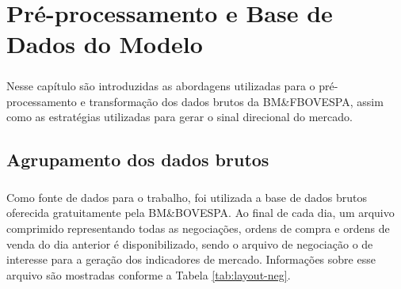 \documentclass[grad,numbers]{coppe}
\begin{document}
\chapter{Pré-processamento e Base de Dados do Modelo}    

    \paragraph{}Nesse capítulo são introduzidas as abordagens utilizadas para o pré-processamento e transformação dos dados brutos da BM\&FBOVESPA, assim como as estratégias utilizadas para gerar o sinal direcional do mercado. 
    
    \section{Agrupamento dos dados brutos}\label{sec:grouping}
    
        \paragraph{}Como fonte de dados para o trabalho, foi utilizada a base de dados brutos oferecida gratuitamente pela BM\&BOVESPA. Ao final de cada dia, um arquivo comprimido representando todas as negociações, ordens de compra e ordens de venda do dia anterior é disponibilizado, sendo o arquivo de negociação o de interesse para a geração dos indicadores de mercado. Informações sobre esse arquivo são mostradas conforme a Tabela \ref{tab:layout-neg}.
        
\end{document}
